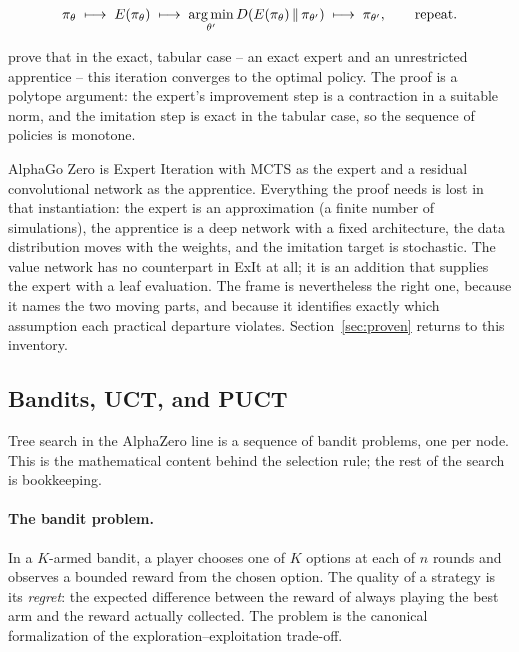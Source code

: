 \begin{equation}
\pi_{\theta} \;\longmapsto\; E(\pi_\theta) \;\longmapsto\;
\operatorname*{arg\,min}_{\theta'} D\!\left(E(\pi_\theta) \, \|\, \pi_{\theta'}\right)
\;\longmapsto\; \pi_{\theta'}, \qquad \text{repeat.}
\label{eq:exit}
\end{equation}

\citet{anthony2017exit} prove that in the exact, tabular case -- an exact expert
and an unrestricted apprentice -- this iteration converges to the optimal policy.
The proof is a polytope argument: the expert's improvement step is a contraction
in a suitable norm, and the imitation step is exact in the tabular case, so the
sequence of policies is monotone.

AlphaGo Zero is Expert Iteration with MCTS as the expert and a residual
convolutional network as the apprentice. Everything the proof needs is lost in
that instantiation: the expert is an approximation (a finite number of
simulations), the apprentice is a deep network with a fixed architecture, the
data distribution moves with the weights, and the imitation target is stochastic.
The value network has no counterpart in ExIt at all; it is an addition that
supplies the expert with a leaf evaluation. The frame is nevertheless the right
one, because it names the two moving parts, and because it identifies exactly
which assumption each practical departure violates. Section~\ref{sec:proven}
returns to this inventory.

\subsection{Bandits, UCT, and PUCT}
\label{sec:bandits}

Tree search in the AlphaZero line is a sequence of bandit problems, one per
node. This is the mathematical content behind the selection rule; the rest of
the search is bookkeeping.

\paragraph{The bandit problem.} In a $K$-armed bandit, a player chooses one of
$K$ options at each of $n$ rounds and observes a bounded reward from the chosen
option. The quality of a strategy is its \emph{regret}: the expected difference
between the reward of always playing the best arm and the reward actually
collected. The problem is the canonical formalization of the
exploration--exploitation trade-off.

